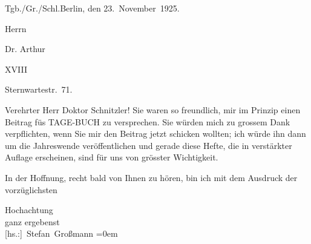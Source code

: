 \pstart
           Tgb./Gr./Schl.\hfill Berlin, den
                     23. November 1925.\pend
           
\pstart
           \raggedleft{}Herrn\pend
           
\pstart
           \raggedleft{}Dr. Arthur \pend
           
\pstart
           \raggedleft{} XVIII\pend
           
\pstart
           \raggedleft{}Sternwartestr. 71.\pend
           
\pstart\center{}Verehrter Herr Doktor Schnitzler!\pend\vspace{0.5em}
\pstart
           Sie waren so freundlich, mir im Prinzip einen Beitrag füs TAGE-BUCH zu versprechen. Sie würden mich zu grossem Dank verpflichten, wenn Sie mir den
               Beitrag jetzt schicken wollten; ich würde ihn dann um die Jahreswende veröffentlichen
               und gerade diese Hefte, die in verstärkter Auflage erscheinen, sind für uns von
               grösster Wichtigkeit.\pend
           
\pstart
           In der Hoffnung, recht bald von Ihnen zu hören, bin ich mit dem Ausdruck der
               vorzüglichsten\pend
           
\pstart
           Hochachtung{\\[\baselineskip]}ganz ergebenst{\\[\baselineskip]}\spacefill\mbox{{[}hs.:{]} Stefan Großmann}\pend
           \leftskip=0em{}\endnumbering{}  \newcommand{\dateiname}{L02456}\newcommand{\titel}{Stefan Großmann an Arthur Schnitzler, 23. 11. 1925}\newcommand{\editorInnen}{Herausgegeben von Martin Anton Müller}
